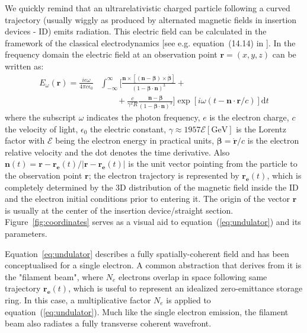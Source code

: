 \documentclass{iucr}              %
\begin{document}
We quickly remind that an ultrarelativistic charged particle following a curved trajectory (usually wiggly as produced by alternated magnetic fields in insertion devices - ID) emits radiation. This electric field can be calculated in the framework of the classical electrodynamics [see e.g. equation~(14.14) in \cite{jackson}]. In the frequency domain the electric field at an observation point $\textbf{r}=(x,y,z)$ can be written as: 
\begin{equation}
\begin{split}
    E_{\omega}(\textbf{r}) = \frac{i e \omega}{4 \pi c \epsilon_0} 
    &\int_{-\infty}^{\infty}
    \biggl[ 
    \frac{\textbf{n} \times [(\textbf{n} - \mathbf{\beta}) \times \dot{\mathbf{\beta}}]}
    {(1- \mathbf{\beta} \cdot \textbf{n})^3} +\\
    &\qquad+\frac{c}{\gamma^2 R}   \frac{\textbf{n} - \mathbf{\beta}}{(1-\mathbf{\beta} \cdot \textbf{n})^3} \biggr]
    \exp[i \omega (t - \textbf{n}\cdot\textbf{r}/c)] \mathrm{d}t
\end{split}\label{eq:undulator}
\end{equation}
where the subscript $\omega$ indicates the photon frequency, $e$ is the electron charge, $c$ the velocity of light, $\epsilon_0$ the electric constant, $\gamma \approx 1957\mathcal{E}[\mathrm{GeV}]$ is the Lorentz factor with $\mathcal{E}$ being the electron energy in practical units, $\mathbf{\beta}=\dot{\mathbf{r}}\big/c$ is the electron relative velocity and the dot denotes the time derivative.
Also $\textbf{n}(t)=\textbf{r}-\textbf{r}_{\textbf{e}}(t)\big/|\textbf{r}-\textbf{r}_{\textbf{e}}(t)|$ is the unit vector pointing from the particle to the observation point $\textbf{r}$; the electron trajectory is represented by $\textbf{r}_{\textbf{e}}(t)$, which is completely determined by the 3D distribution of the magnetic field inside the ID and the electron initial conditions prior to entering it. The origin of the vector $\textbf{r}$ is usually at the center of the insertion device/straight section. Figure~\ref{fig:coordinates} serves as a visual aid to equation~(\ref{eq:undulator}) and its parameters. 

Equation~\ref{eq:undulator} describes a fully spatially-coherent field and has been conceptualised for a single electron. A common abstraction that derives from it is the "filament beam", where $N_e$ electrons overlap in space following same trajectory $\textbf{r}_{\textbf{e}}(t)$, which is useful to  represent an idealized zero-emittance storage ring. In this case, a multiplicative factor $N_e$ is applied to equation~(\ref{eq:undulator}). Much like the single electron emission, the filament beam also radiates a fully transverse coherent wavefront.
\end{document}
